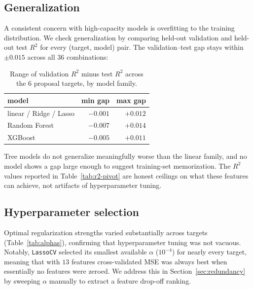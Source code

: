 \documentclass[11pt]{article}
\begin{document}
\subsection{Generalization}

A consistent concern with high-capacity models is overfitting to the training distribution. We check generalization by comparing held-out validation and held-out test $R^2$ for every (target, model) pair. The validation--test gap stays within $\pm 0.015$ across all $36$ combinations:

\begin{table}[H]
\centering
\caption{Range of validation $R^2$ minus test $R^2$ across the 6 proposal targets, by model family.}
\label{tab:gen-gap}
\small
\begin{tabular}{lrr}
\toprule
\textbf{model} & \textbf{min gap} & \textbf{max gap} \\
\midrule
linear / Ridge / Lasso & $-0.001$ & $+0.012$ \\
Random Forest          & $-0.007$ & $+0.014$ \\
XGBoost                & $-0.005$ & $+0.011$ \\
\bottomrule
\end{tabular}
\end{table}

Tree models do not generalize meaningfully worse than the linear family, and no model shows a gap large enough to suggest training-set memorization. The $R^2$ values reported in Table~\ref{tab:r2-pivot} are honest ceilings on what these features can achieve, not artifacts of hyperparameter tuning.

\subsection{Hyperparameter selection}

Optimal regularization strengths varied substantially across targets (Table~\ref{tab:alphas}), confirming that hyperparameter tuning was not vacuous. Notably, \texttt{LassoCV} selected its smallest available $\alpha$ ($10^{-4}$) for nearly every target, meaning that with $13$ features cross-validated MSE was always best when essentially no features were zeroed. We address this in Section~\ref{sec:redundancy} by sweeping $\alpha$ manually to extract a feature drop-off ranking.
\end{document}

